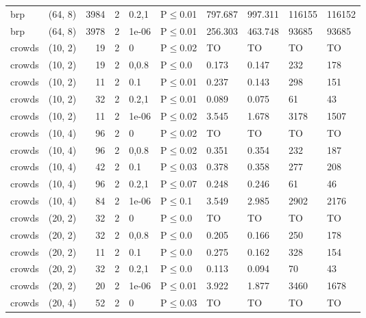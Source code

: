 \begin{longtable}{llrrllllll}
 brp           & (64, 8)   &   	3984 &    2 & 0.2,1 & P$\leq$0.01  & 797.687 & 997.311  & 116155 & 116152 \\
 brp           & (64, 8)   &   	3978 &    2 & 1e-06 & P$\leq$0.01  & 256.303 & 463.748  & 93685  & 93685  \\
 crowds        & (10, 2)   &     	19 &    2 & 0     & P$\leq$0.02  & TO      & TO       & TO     & TO     \\
 crowds        & (10, 2)   &     	19 &    2 & 0,0.8 & P$\leq$0.0   & 0.173   & 0.147    & 232    & 178    \\
 crowds        & (10, 2)   &     	11 &    2 & 0.1   & P$\leq$0.01  & 0.237   & 0.143    & 298    & 151    \\
 crowds        & (10, 2)   &     	32 &    2 & 0.2,1 & P$\leq$0.01  & 0.089   & 0.075    & 61     & 43     \\
 crowds        & (10, 2)   &     	11 &    2 & 1e-06 & P$\leq$0.02  & 3.545   & 1.678    & 3178   & 1507   \\
 crowds        & (10, 4)   &     	96 &    2 & 0     & P$\leq$0.02  & TO      & TO       & TO     & TO     \\
 crowds        & (10, 4)   &     	96 &    2 & 0,0.8 & P$\leq$0.02  & 0.351   & 0.354    & 232    & 187    \\
 crowds        & (10, 4)   &     	42 &    2 & 0.1   & P$\leq$0.03  & 0.378   & 0.358    & 277    & 208    \\
 crowds        & (10, 4)   &     	96 &    2 & 0.2,1 & P$\leq$0.07  & 0.248   & 0.246    & 61     & 46     \\
 crowds        & (10, 4)   &     	84 &    2 & 1e-06 & P$\leq$0.1   & 3.549   & 2.985    & 2902   & 2176   \\
 crowds        & (20, 2)   &     	32 &    2 & 0     & P$\leq$0.0   & TO      & TO       & TO     & TO     \\
 crowds        & (20, 2)   &     	32 &    2 & 0,0.8 & P$\leq$0.0   & 0.205   & 0.166    & 250    & 178    \\
 crowds        & (20, 2)   &     	11 &    2 & 0.1   & P$\leq$0.0   & 0.275   & 0.162    & 328    & 154    \\
 crowds        & (20, 2)   &     	32 &    2 & 0.2,1 & P$\leq$0.0   & 0.113   & 0.094    & 70     & 43     \\
 crowds        & (20, 2)   &     	20 &    2 & 1e-06 & P$\leq$0.01  & 3.922   & 1.877    & 3460   & 1678   \\
 crowds        & (20, 4)   &     	52 &    2 & 0     & P$\leq$0.03  & TO      & TO       & TO     & TO     \\

\end{longtable}
